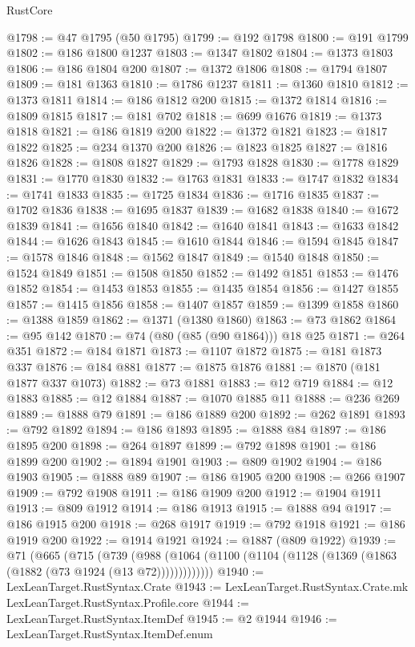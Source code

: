 \begin{lexlean}{RustCore}
\begin{coremodule}
@1798 := @47 @1795 (@50 @1795)
@1799 := @192 @1798
@1800 := @191 @1799
@1802 := @186 @1800 @1237
@1803 := @1347 @1802
@1804 := @1373 @1803
@1806 := @186 @1804 @200
@1807 := @1372 @1806
@1808 := @1794 @1807
@1809 := @181 @1363
@1810 := @1786 @1237
@1811 := @1360 @1810
@1812 := @1373 @1811
@1814 := @186 @1812 @200
@1815 := @1372 @1814
@1816 := @1809 @1815
@1817 := @181 @702
@1818 := @699 @1676
@1819 := @1373 @1818
@1821 := @186 @1819 @200
@1822 := @1372 @1821
@1823 := @1817 @1822
@1825 := @234 @1370 @200
@1826 := @1823 @1825
@1827 := @1816 @1826
@1828 := @1808 @1827
@1829 := @1793 @1828
@1830 := @1778 @1829
@1831 := @1770 @1830
@1832 := @1763 @1831
@1833 := @1747 @1832
@1834 := @1741 @1833
@1835 := @1725 @1834
@1836 := @1716 @1835
@1837 := @1702 @1836
@1838 := @1695 @1837
@1839 := @1682 @1838
@1840 := @1672 @1839
@1841 := @1656 @1840
@1842 := @1640 @1841
@1843 := @1633 @1842
@1844 := @1626 @1843
@1845 := @1610 @1844
@1846 := @1594 @1845
@1847 := @1578 @1846
@1848 := @1562 @1847
@1849 := @1540 @1848
@1850 := @1524 @1849
@1851 := @1508 @1850
@1852 := @1492 @1851
@1853 := @1476 @1852
@1854 := @1453 @1853
@1855 := @1435 @1854
@1856 := @1427 @1855
@1857 := @1415 @1856
@1858 := @1407 @1857
@1859 := @1399 @1858
@1860 := @1388 @1859
@1862 := @1371 (@1380 @1860)
@1863 := @73 @1862
@1864 := @95 @142
@1870 := @74 (@80 (@85 (@90 @1864))) @18 @25
@1871 := @264 @351
@1872 := @184 @1871
@1873 := @1107 @1872
@1875 := @181 @1873 @337
@1876 := @184 @881
@1877 := @1875 @1876
@1881 := @1870 (@181 @1877 @337 @1073)
@1882 := @73 @1881
@1883 := @12 @719
@1884 := @12 @1883
@1885 := @12 @1884
@1887 := @1070 @1885 @11
@1888 := @236 @269
@1889 := @1888 @79
@1891 := @186 @1889 @200
@1892 := @262 @1891
@1893 := @792 @1892
@1894 := @186 @1893
@1895 := @1888 @84
@1897 := @186 @1895 @200
@1898 := @264 @1897
@1899 := @792 @1898
@1901 := @186 @1899 @200
@1902 := @1894 @1901
@1903 := @809 @1902
@1904 := @186 @1903
@1905 := @1888 @89
@1907 := @186 @1905 @200
@1908 := @266 @1907
@1909 := @792 @1908
@1911 := @186 @1909 @200
@1912 := @1904 @1911
@1913 := @809 @1912
@1914 := @186 @1913
@1915 := @1888 @94
@1917 := @186 @1915 @200
@1918 := @268 @1917
@1919 := @792 @1918
@1921 := @186 @1919 @200
@1922 := @1914 @1921
@1924 := @1887 (@809 @1922)
@1939 := @71
    (@665
      (@715
        (@739
          (@988 (@1064 (@1100 (@1104 (@1128 (@1369 (@1863 (@1882 (@73 @1924 (@13 @72)))))))))))))
@1940 := LexLeanTarget.RustSyntax.Crate
@1943 := LexLeanTarget.RustSyntax.Crate.mk LexLeanTarget.RustSyntax.Profile.core
@1944 := LexLeanTarget.RustSyntax.ItemDef
@1945 := @2 @1944
@1946 := LexLeanTarget.RustSyntax.ItemDef.enum

\end{coremodule}
\end{lexlean}
